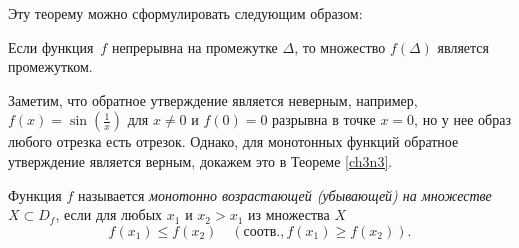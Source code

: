 Эту теорему можно сформулировать следующим образом:	
\begin{thmn}
Если функция~$f$ непрерывна на промежутке $\Delta$, то множество $f(\Delta)$ является промежутком.
\end{thmn}

Заметим, что обратное утверждение является неверным, например, $f(x)= \sin(\frac{1}{x})$ для $x\ne0$ и $f(0) = 0$ разрывна в точке $x = 0$, но у нее образ любого отрезка есть отрезок. Однако, для монотонных функций обратное утверждение является верным, докажем это в Теореме \ref{ch3n3}.
\begin{defn}
Функция $f$ называется \textit{монотонно возрастающей (убывающей) на множестве} $X \subset D_f$, если для любых $x_1$ и $x_2>x_1$ из множества $X$ 
$$
f(x_1)\le f(x_2) \quad (\text{соотв.}, f(x_1)\ge f(x_2)).
$$  
\end{defn}

